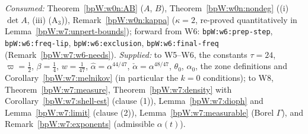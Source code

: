 \begin{remark}\label{bpW:w7:interface}
\emph{Consumed:} Theorem~\ref{bpW:w0n:AB} ($A$, $B$), Theorem~\ref{bpW:w0n:nondeg} ((i) $\det A$, (iii) (A$_3$)),
Remark~\ref{bpW:w0n:kappa} ($\kappa=2$, re-proved quantitatively in Lemma~\ref{bpW:w7:unpert-bounds}); forward from W6:
\texttt{bpW:w6:prep-step}, \texttt{bpW:w6:freq-lip}, \texttt{bpW:w6:exclusion}, \texttt{bpW:w6:final-freq}
(Remark~\ref{bpW:w7:w6-needs}). \emph{Supplied:} to W5--W6, the constants $\tau=24$, $\varpi=\frac12$, $\beta=\frac14$, $w=\frac1{47}$,
$\hat\alpha=\alpha^{44/47}$, $\check\alpha=\alpha^{48/47}$, $\theta_0$,
$\alpha_0$, the zone definitions and Corollary~\ref{bpW:w7:melnikov} (in particular the $k=0$ conditions); to W8,
Theorem~\ref{bpW:w7:measure}, Theorem~\ref{bpW:w7:density} with Corollary~\ref{bpW:w7:shell-est} (clause (1)),
Lemma~\ref{bpW:w7:dioph} and Lemma~\ref{bpW:w7:limit} (clause (2)), Lemma~\ref{bpW:w7:measurable} (Borel $\Gamma$),
and Remark~\ref{bpW:w7:exponents} (admissible $\alpha(t)$).
\end{remark}
